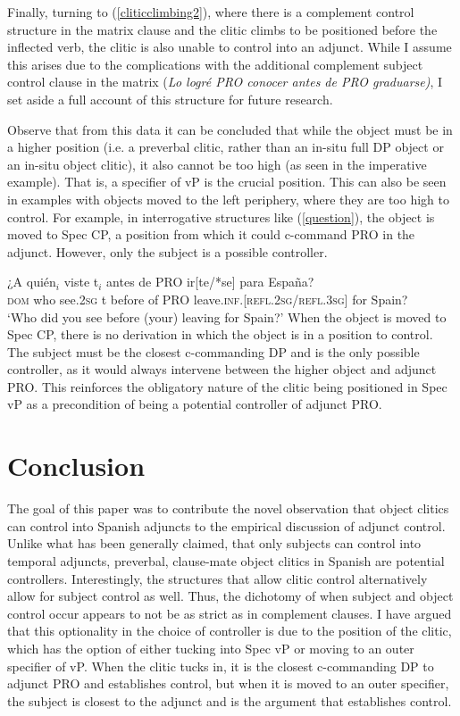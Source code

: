 \documentclass[output=paper,colorlinks,citecolor=brown]{langscibook}
\begin{document}
Finally, turning to (\ref{cliticclimbing2}), where there is a complement control structure in the matrix clause and the clitic climbs to be positioned before the inflected verb, the clitic is also unable to control into an adjunct. While I assume this arises due to the complications with the additional complement subject control clause in the matrix (\textit{Lo logré PRO conocer antes de PRO graduarse)}, I set aside a full account of this structure for future research.


Observe that from this data it can be concluded that while the object must be in a higher position (i.e. a preverbal clitic, rather than an in-situ full DP object or an in-situ object clitic), it also cannot be too high (as seen in the imperative example). That is, a specifier of vP is the crucial position. This can also be seen in examples with objects moved to the left periphery, where they are too high to control. For example, in interrogative structures like (\ref{question}), the object is moved to Spec CP, a position from which it could c-command PRO in the adjunct. However, only the subject is a possible controller.

\ea \label{question}
\gll ¿A quién$_i$ viste t$_i$ antes de PRO ir[te/*se] para España? \\
\textsc{dom} who see.\textsc{2sg} t before of PRO leave.\textsc{inf.[refl.2sg/refl.3sg]} for Spain? \\
\glt ‘Who did you see before (your) leaving for Spain?’
\z
When the object is moved to Spec CP, there is no derivation in which the object is in a position to control. The subject must be the closest c-commanding DP and is the only possible controller, as it would always intervene between the higher object and adjunct PRO. This reinforces the obligatory nature of the clitic being positioned in Spec vP as a precondition of being a potential controller of adjunct PRO.

\section{Conclusion} \label{Conclusion}
The goal of this paper was to contribute the novel observation that object clitics can control into Spanish adjuncts to the empirical discussion of adjunct control. Unlike what has been generally claimed, that only subjects can control into temporal adjuncts, preverbal, clause-mate object clitics in Spanish are potential controllers. Interestingly, the structures that allow clitic control alternatively allow for subject control as well. Thus, the dichotomy of when subject and object control occur appears to not be as strict as in complement clauses. I have argued that this optionality in the choice of controller is due to the position of the clitic, which has the option of either tucking into Spec vP or moving to an outer specifier of vP. When the clitic tucks in, it is the closest c-commanding DP to adjunct PRO and establishes control, but when it is moved to an outer specifier, the subject is closest to the adjunct and is the argument that establishes control.
\end{document}
